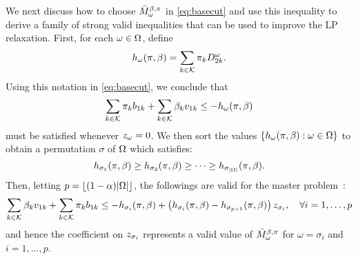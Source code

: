 \documentclass[msom]{oo}
\begin{document}
 We next discuss how to choose $\bar{M}_{\omega}^{\beta,\pi}$ in \eqref{eq:basecut} and use this inequality to derive a family of strong valid inequalities that can be used to improve the LP relaxation. First, for each 
 $\omega \in \Omega$, define
\[ h_{\omega}(\pi,\beta) = \sum_{k  \in \mathcal{K}} \pi_k D^{\omega}_{2k}. \]
Using this notation in \eqref{eq:basecut}, 
we conclude that
\[ \sum_{k  \in \mathcal{K}} \pi_k b_{1k} + \sum_{k  \in \mathcal{K}} \beta_k v_{1k} \leq -  h_{\omega}(\pi,\beta) \]
must be satisfied whenever $z_{\omega} = 0$. We then sort the values $\{ h_{\omega}(\pi,\beta) : \omega \in \Omega\}$ to obtain a permutation $\sigma$ of $\Omega$ which satisfies:
\[ h_{\sigma_1}(\pi,\beta) \geq h_{\sigma_2}(\pi,\beta)  \geq \cdots \geq h_{\sigma_{|\Omega|}}(\pi,\beta) .
 \]
Then, letting $p = \lfloor (1-\alpha) |\Omega| \rfloor$, the followings 
are valid for the master problem~\citep{luedtke2014branch}:
\[ \sum_{k  \in \mathcal{K}} \beta_k v_{1k} + \sum_{k  \in \mathcal{K}} \pi_k b_{1k} \leq
  - h_{\sigma_i}(\pi,\beta) + \left(h_{\sigma_i}(\pi,\beta) - h_{\sigma_{p+1}}(\pi,\beta)\right)z_{\sigma_i}, \quad \forall i=1,\ldots, p \]
and hence the coefficient on $z_{\sigma_i}$ represents a valid value of $\bar{M}_{\omega}^{\beta,\pi}$ for $\omega = \sigma_i$ and $i=1,\ldots,p$.
 
\end{document}

